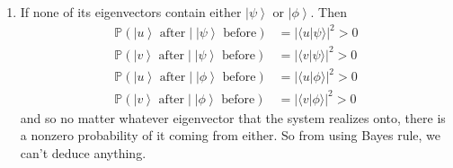 \documentclass{article}
\newcommand{\ket}[1]{\ensuremath{\left|#1\right\rangle}}
\newcommand{\braket}[2]{\langle #1 | #2 \rangle}
\begin{document}
    \begin{enumerate} 
      \item If none of its eigenvectors contain either $\ket{\psi}$ or $\ket{\phi}$. Then 
        \begin{align} 
           \mathbb{P}(\ket{u} \text{ after} \mid \ket{\psi} \text{ before}) & = |\braket{u}{\psi}|^2 > 0 \\
           \mathbb{P}(\ket{v} \text{ after} \mid \ket{\psi} \text{ before}) & = |\braket{v}{\psi}|^2 > 0 \\ 
           \mathbb{P}(\ket{u} \text{ after} \mid \ket{\phi} \text{ before}) & = |\braket{u}{\phi}|^2 > 0 \\ 
           \mathbb{P}(\ket{v} \text{ after} \mid \ket{\phi} \text{ before}) & = |\braket{v}{\phi}|^2 > 0 
        \end{align}
        and so no matter whatever eigenvector that the system realizes onto, there is a nonzero probability of it coming from either. So from using Bayes rule, we can't deduce anything. 


\end{enumerate}
\end{document}
